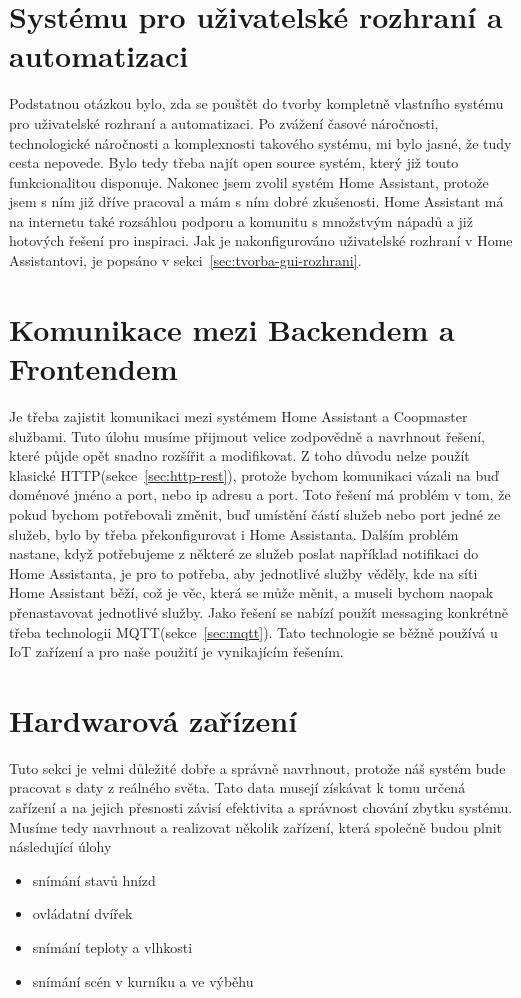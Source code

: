 \section{Systému pro uživatelské rozhraní a automatizaci}\label{sec:systemu-pro-uzivatelske-rozhrani-a-automatizaci}
Podstatnou otázkou bylo, zda se pouštět do tvorby kompletně vlastního systému pro uživatelské rozhraní a automatizaci.
Po zvážení časové náročnosti, technologické náročnosti a komplexnosti takového systému, mi bylo jasné, že tudy cesta nepovede.
Bylo tedy třeba najít open source systém, který již touto funkcionalitou disponuje.
Nakonec jsem zvolil systém Home Assistant, protože jsem s ním již dříve pracoval a mám s ním dobré zkušenosti.
Home Assistant má na internetu také rozsáhlou podporu a komunitu s množstvým nápadů a již hotových řešení pro inspiraci.
Jak je nakonfigurováno uživatelské rozhraní v Home Assistantovi, je popsáno v sekci~\ref{sec:tvorba-gui-rozhrani}.

\section{Komunikace mezi Backendem a Frontendem}\label{sec:komunikace-mezi-backendem-a-frontendem}
Je třeba zajistit komunikaci mezi systémem Home Assistant a Coopmaster službami.
Tuto úlohu musíme přijmout velice zodpovědně a navrhnout řešení, které půjde opět snadno rozšířit a modifikovat.
Z toho důvodu nelze použít klasické HTTP(sekce~\ref{sec:http-rest}), protože bychom komunikaci vázali na buď doménové jméno a port, nebo ip adresu a port.
Toto řešení má problém v tom, že pokud bychom potřebovali změnit, buď umístění částí služeb nebo port jedné ze služeb, bylo by třeba překonfigurovat i Home Assistanta.
Dalším problém nastane, když potřebujeme z některé ze služeb poslat například notifikaci do Home Assistanta, je pro to potřeba, aby jednotlivé služby věděly, kde na síti Home Assistant běží, což je věc, která se může měnit, a museli bychom naopak přenastavovat jednotlivé služby.
Jako řešení se nabízí použít messaging konkrétně třeba technologii MQTT(sekce~\ref{sec:mqtt}).
Tato technologie se běžně používá u IoT zařízení a pro naše použití je vynikajícím řešením.

\section{Hardwarová zařízení}\label{sec:hardwarova-zarizeni}
Tuto sekci je velmi důležité dobře a správně navrhnout, protože náš systém bude pracovat s daty z reálného světa.
Tato data musejí získávat k tomu určená zařízení a na jejich přesnosti závisí efektivita a správnost chování zbytku systému.
Musíme tedy navrhnout a realizovat několik zařízení, která společně budou plnit následující úlohy
\begin{itemize}
    \item snímání stavů hnízd
    \item ovládatní dvířek
    \item snímání teploty a vlhkosti
    \item snímání scén v kurníku a ve výběhu
\end{itemize}

